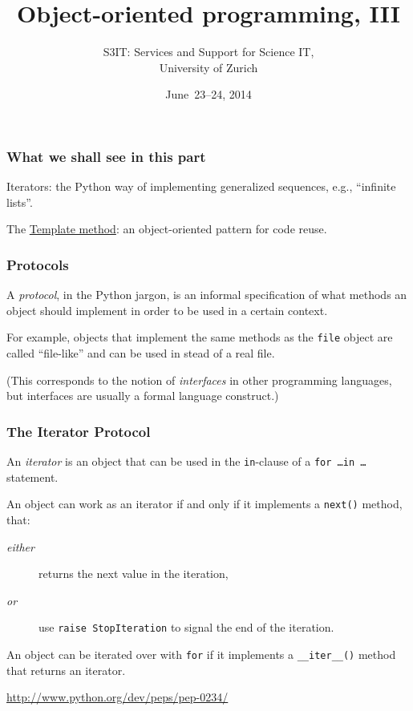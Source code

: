 \documentclass[english,serif,mathserif,xcolor=pdftex,dvipsnames,table]{beamer}
\title[OOP 3]{%
  Object-oriented programming, III
}
\author[S3IT]{%
  S3IT: Services and Support for Science IT, \\
  University of Zurich
}
\date{June~23--24, 2014}
\begin{document}
\maketitle


\begin{frame}
  \frametitle{What we shall see in this part}

  Iterators: the Python way of implementing generalized sequences,
  e.g., ``infinite lists''.

  \+
  The \href{http://en.wikipedia.org/wiki/Template_method_pattern}{Template
    method}: an object-oriented pattern for code reuse.
\end{frame}


\begin{frame}
  \frametitle{Protocols}
  A \emph{protocol}, in the Python jargon, is an informal
  specification of what methods an object should implement in order to
  be used in a certain context.

  \+ For example, objects that implement the same methods as the
  \texttt{file} object are called ``file-like'' and can be used in
  stead of a real file.

  \+
  (This corresponds to the notion of \emph{interfaces} in other
  programming languages, but interfaces are usually a formal language
  construct.)
\end{frame}


\begin{frame}[fragile]
  \frametitle{The Iterator Protocol}

  An \emph{iterator} is an object that can be used in the
  \texttt{in}-clause of a \texttt{for \ldots in \ldots} statement.

  \+
  An object can work as an iterator if and only if it implements a
  \texttt{next()} method, that:
  \begin{description}
  \item[\emph{either}] returns the next value in the iteration,
  \item[\emph{or}] use \lstinline|raise StopIteration| to signal the
    end of the iteration.
  \end{description}

  \+
  An object can be iterated over with \lstinline|for| if it implements a
  \lstinline|__iter__()| method that returns an iterator.

  \begin{references}
    \url{http://www.python.org/dev/peps/pep-0234/}
  \end{references}
\end{frame}
\end{document}
